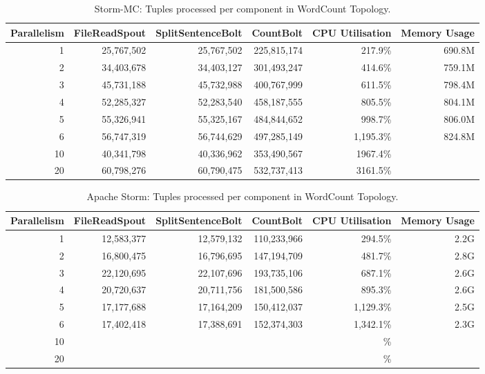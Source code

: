 \medskip
\begin{table}[!htb]
\begin{adjustwidth}{-0.5in}{-0.5in}
\centering
\small
\begin{tabular}{@{}rrrrrr@{}}
    {Parallelism} & {FileReadSpout} & {SplitSentenceBolt} & {CountBolt} & {CPU Utilisation} & {Memory Usage} \\ \toprule
    1 & {25,767,502} & {25,767,502} & {225,815,174} & {217.9\%} & {690.8M} \\
    2 & {34,403,678} & {34,403,127} & {301,493,247} & {414.6\%} & {759.1M} \\
    3 & {45,731,188} & {45,732,988} & {400,767,999} & {611.5\%} & {798.4M} \\
    4 & {52,285,327} & {52,283,540} & {458,187,555} & {805.5\%} & {804.1M} \\
	5 & {55,326,941} & {55,325,167} & {484,844,652} & {998.7\%} & {806.0M} \\
	6 & {56,747,319} & {56,744,629} & {497,285,149} & {1,195.3\%} & {824.8M} \\
	10 & {40,341,798} & {40,336,962} & {353,490,567} & {1967.4\%} & {} \\
	20 & {60,798,276} & {60,790,475} & {532,737,413} & {3161.5\%} & {} \\
\end{tabular}
\caption{Storm-MC: Tuples processed per component in WordCount Topology.}
\label{table:storm_mc_wordcount}
\end{adjustwidth}
\end{table}
\medskip

\medskip
\begin{table}[!htb]
\begin{adjustwidth}{-0.5in}{-0.5in}
\centering
\small
\begin{tabular}{@{}rrrrrr@{}}
    {Parallelism} & {FileReadSpout} & {SplitSentenceBolt} & {CountBolt} & {CPU Utilisation} & {Memory Usage} \\ \toprule
    1 & {12,583,377} & {12,579,132} & {110,233,966} & {294.5\%} & {2.2G} \\
    2 & {16,800,475} & {16,796,695} & {147,194,709} & {481.7\%} & {2.8G} \\
    3 & {22,120,695} & {22,107,696} & {193,735,106} & {687.1\%} & {2.6G} \\
    4 & {20,720,637} & {20,711,756} & {181,500,586} & {895.3\%} & {2.6G} \\
	5 & {17,177,688} & {17,164,209} & {150,412,037} & {1,129.3\%} & {2.5G} \\
	6 & {17,402,418} & {17,388,691} & {152,374,303} & {1,342.1\%} & {2.3G} \\
	10 & {} & {} & {} & {\%} & {} \\
	20 & {} & {} & {} & {\%} & {} \\
\end{tabular}
\caption{Apache Storm: Tuples processed per component in WordCount Topology.}
\label{table:storm_wordcount}
\end{adjustwidth}
\end{table}
\medskip



